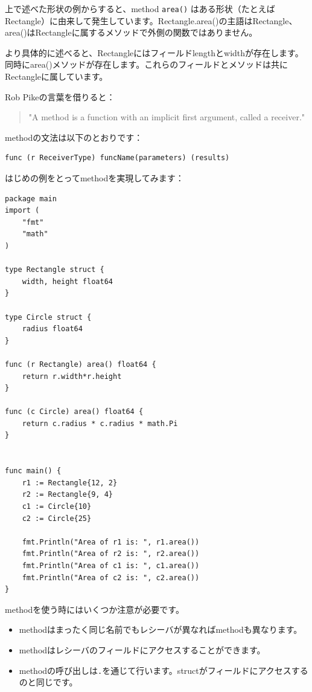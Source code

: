 上で述べた形状の例からすると、method \texttt{area()} はある形状（たとえばRectangle）に由来して発生しています。Rectangle.area()の主語はRectangle、area()はRectangleに属するメソッドで外側の関数ではありません。

より具体的に述べると、Rectangleにはフィールドlengthとwidthが存在します。同時にarea()メソッドが存在します。これらのフィールドとメソッドは共にRectangleに属しています。

Rob Pikeの言葉を借りると：

\begin{quote}
"A method is a function with an implicit first argument, called a receiver."
\end{quote}

methodの文法は以下のとおりです：

\begin{lstlisting}[numbers=none]
func (r ReceiverType) funcName(parameters) (results)
\end{lstlisting}

はじめの例をとってmethodを実現してみます：

\begin{lstlisting}[numbers=none]
package main
import (
    "fmt"
    "math"
)

type Rectangle struct {
    width, height float64
}

type Circle struct {
    radius float64
}

func (r Rectangle) area() float64 {
    return r.width*r.height
}

func (c Circle) area() float64 {
    return c.radius * c.radius * math.Pi
}


func main() {
    r1 := Rectangle{12, 2}
    r2 := Rectangle{9, 4}
    c1 := Circle{10}
    c2 := Circle{25}

    fmt.Println("Area of r1 is: ", r1.area())
    fmt.Println("Area of r2 is: ", r2.area())
    fmt.Println("Area of c1 is: ", c1.area())
    fmt.Println("Area of c2 is: ", c2.area())
}
\end{lstlisting}

methodを使う時にはいくつか注意が必要です。

\begin{itemize}
  \item methodはまったく同じ名前でもレシーバが異なればmethodも異なります。
  \item methodはレシーバのフィールドにアクセスすることができます。
  \item methodの呼び出しは\texttt{.}を通じて行います。structがフィールドにアクセスするのと同じです。
\end{itemize}

